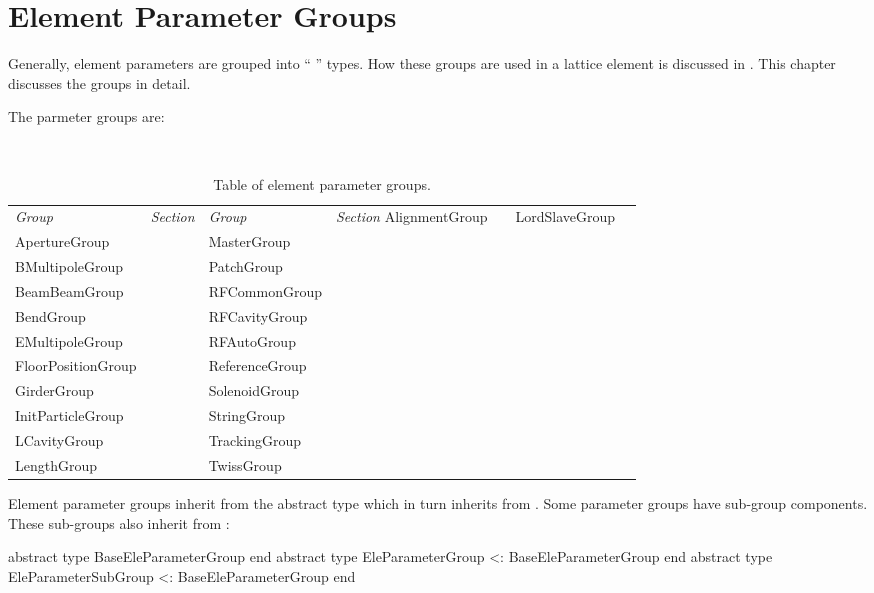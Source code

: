 \chapter{Element Parameter Groups}
\label{c:ele.groups}

Generally, element parameters are grouped into ``  '' 
types. How these groups are used in a lattice element is discussed in . 
This chapter discusses the groups in detail.

The parmeter groups are:
\begin{table}[htb]
\centering
{\tt
\begin{tabular}{llll} \toprule
  {\it Group}        & {\it Section}             & {\it Group}         & {\it Section}          \midrule
 AlignmentGroup      &       & LordSlaveGroup      &  \\
 ApertureGroup       &        & MasterGroup         &      \\
 BMultipoleGroup     &      & PatchGroup          &       \\ 
 BeamBeamGroup       &       & RFCommonGroup       &    \\
 BendGroup           &            & RFCavityGroup       &     \\ 
 EMultipoleGroup     &      & RFAutoGroup         &    \\
 FloorPositionGroup  &       & ReferenceGroup      &   \\
 GirderGroup         &          & SolenoidGroup       &    \\
 InitParticleGroup   &   & StringGroup         &      \\
 LCavityGroup        &         & TrackingGroup       &    \\
 LengthGroup         &          & TwissGroup          &       \\ 
  \bottomrule
\end{tabular}
} 
\caption{Table of element parameter groups.}
\label{t:ele.param.g}
\end{table}

Element parameter groups inherit from the abstract type  which
in turn inherits from . Some
parameter groups have sub-group components. 
These sub-groups also inherit from :
\begin{example}
  abstract type BaseEleParameterGroup end
  abstract type EleParameterGroup <: BaseEleParameterGroup end
  abstract type EleParameterSubGroup <: BaseEleParameterGroup end
\end{example}

